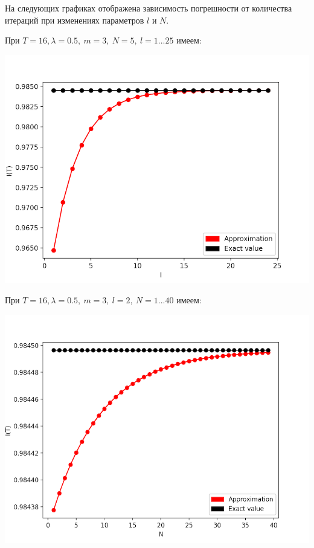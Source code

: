 \documentclass [12pt]{report}
\begin{document}
\vspace{5mm}

На следующих графиках отображена зависимость погрешности от количества итераций при изменениях параметров $l$ и $N$.

\noindent При $T=16, \lambda=0.5,~m=3, ~N=5, ~l=1...25$ имеем:
\begin{center}
\includegraphics{l_dependency.png}
\end{center}

\noindent При $T=16, \lambda=0.5,~m=3, ~l=2, ~N=1...40$ имеем:
\begin{center}
\includegraphics{n_dependency.png}
\end{center}
\end{document}
